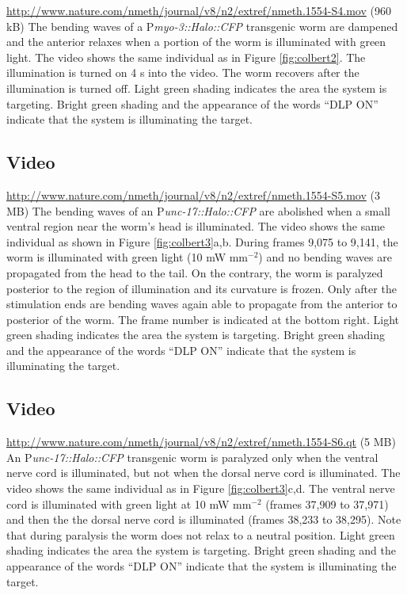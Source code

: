 \url{http://www.nature.com/nmeth/journal/v8/n2/extref/nmeth.1554-S4.mov} (960 kB)
The bending waves of a P\textit{myo-3::Halo::CFP} transgenic worm are dampened and the anterior relaxes when a portion of the worm is illuminated with green light. The video shows the same individual as in Figure \ref{fig:colbert2}. The illumination is turned on 4 s into the video. The worm recovers after the illumination is turned off.  Light green shading indicates the area  the system is targeting. Bright green shading and the appearance of the words “DLP ON” indicate that the system is illuminating the target.

\subsection{Video}\label{movie:colbert4} %

\url{http://www.nature.com/nmeth/journal/v8/n2/extref/nmeth.1554-S5.mov} (3 MB)
The bending waves of an P\textit{unc-17::Halo::CFP} are abolished when a small ventral region near the worm's head is illuminated. The video shows the same individual as shown in Figure \ref{fig:colbert3}a,b. During frames 9,075 to 9,141, the worm is illuminated with green light (10 mW mm$^{−2}$) and no bending waves are propagated from the head to the tail. On the contrary, the worm is paralyzed posterior to the region of illumination and its curvature is frozen. Only after the stimulation ends are bending waves again able to propagate from the anterior to posterior of the worm. The frame number is indicated at the bottom right. Light green shading indicates the area the system is targeting. Bright green shading and the appearance of the words “DLP ON” indicate that the system is illuminating the target.

\subsection{Video}\label{movie:colbert5} %

\url{http://www.nature.com/nmeth/journal/v8/n2/extref/nmeth.1554-S6.qt} (5 MB)
 An P\textit{unc-17::Halo::CFP} transgenic worm is paralyzed only when the ventral nerve cord is illuminated, but not when the dorsal nerve cord is illuminated. The video shows the same individual as in Figure \ref{fig:colbert3}c,d. The ventral nerve cord is illuminated with green light at 10 mW mm$^{−2}$ (frames 37,909 to 37,971) and then the the dorsal nerve cord is illuminated (frames 38,233 to 38,295). Note that during paralysis the worm does not relax to a neutral position. Light green shading indicates the area the system is targeting. Bright green shading and the appearance of the words “DLP ON” indicate that the system is illuminating the target.

